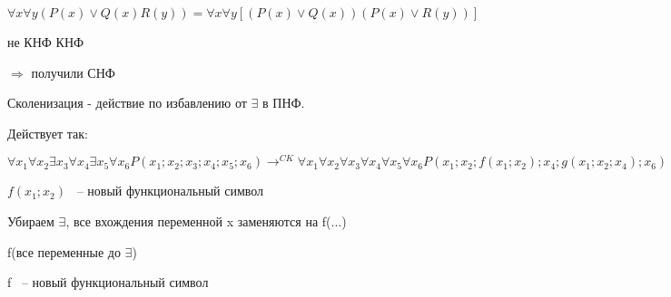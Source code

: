 \documentclass[russian]{lecture-notes}
\begin{document}
    \begin{example}

        $\forall x \forall y (P(x) \lor Q(x)R(y)) = \forall x \forall y [(P(x) \lor Q(x))(P(x) \lor R(y))]$

        \qquad \qquad \qquad \qquad не КНФ \qquad \qquad \qquad \qquad \qquad \qquad КНФ

        $\Rightarrow $ получили СНФ


        \end{example}

    \begin{definition}

        Сколенизация - действие по избавлению от $\exists$ в ПНФ.

        \end{definition}

    Действует так:

    $\forall x_{1} \forall x_{2} \exists x_{3} \forall x_{4} \exists x_{5} \forall x_{6} P(x_{1};x_{2};
    x_{3};x_{4};x_{5};x_{6}) \rightarrow^{CK} \forall x_{1} \forall x_{2} \forall x_{3} \forall x_{4} \forall x_{5}
    \forall x_{6} P(x_{1};x_{2};f(x_{1};x_{2});x_{4};g(x_{1};x_{2};x_{4});x_{6})$

    $f(x_{1};x_{2})$ ~-- новый функциональный символ


    Убираем $\exists$, все вхождения переменной x заменяются на f(...)


    f(все переменные до $\exists$)

    f ~-- новый функциональный символ
\end{document}

